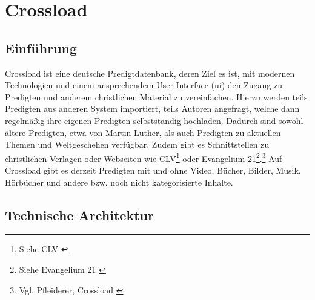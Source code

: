 \chapter{Crossload}
\label{ch:Crossload}

\section{Einführung}
\label{sec:crossload}

Crossload ist eine deutsche Predigtdatenbank, deren Ziel es ist, mit modernen Technologien und einem ansprechendem User Interface (\gls{ui}) den Zugang zu Predigten und anderem christlichen Material zu vereinfachen.
Hierzu werden teils Predigten aus anderen System importiert, teils Autoren angefragt, welche dann regelmäßig ihre eigenen Predigten selbstständig hochladen.
Dadurch sind sowohl ältere Predigten, etwa von Martin Luther, als auch Predigten zu aktuellen Themen und Weltgeschehen verfügbar.
Zudem gibt es Schnittstellen zu christlichen Verlagen oder Webseiten wie CLV\footnote{Siehe CLV \cite{clv2022}} oder Evangelium 21\footnote{Siehe Evangelium 21 \cite{evangelium21e.v.2022}}.\footnote{Vgl. Pfleiderer, Crossload \cite{pfleiderer2022}}
Auf Crossload gibt es derzeit Predigten mit und ohne Video, Bücher, Bilder, Musik, Hörbücher und andere bzw. noch nicht kategorisierte Inhalte.

\section{Technische Architektur}
\label{sec:architektur}

